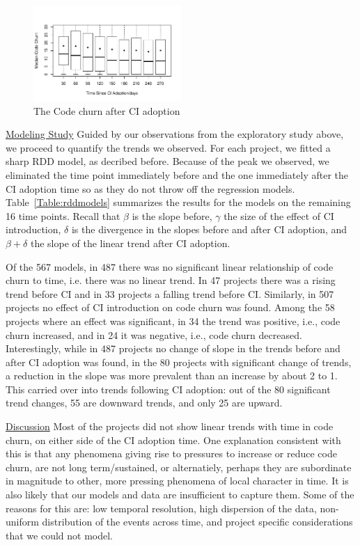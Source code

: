 \begin{figure}[!t]
\centering
\includegraphics[width=0.5\textwidth]{churn_after.pdf}
\caption{The Code churn after CI adoption}
\label{Fig:CodeChurnAfter}
\end{figure}

\noindent \underline{Modeling Study} 
Guided by our observations from the exploratory study above, we proceed to quantify the trends we observed.
For each project, we fitted a sharp RDD model, as decribed before.
Because of the peak we observed, we eliminated the time point immediately before and the one immediately after the CI adoption time so as they do not throw off the regression models.
Table~\ref{Table:rddmodels} summarizes the results for the models on the remaining 16 time points.
Recall that $\beta$ is the slope before, $\gamma$ the size of the effect of CI introduction, $\delta$ is the divergence in the slopes before and after CI adoption, and $\beta + \delta$ the slope of the linear trend after CI adoption.

Of the 567 models, in 487  there was no significant linear relationship of code churn to time, i.e. there was no linear trend.
In 47 projects there was a rising trend before CI and in 33 projects a falling trend before CI.
Similarly, in 507 projects no effect of CI introduction on code churn was found. Among the 58 projects where an effect was significant, in 34 the trend was positive, i.e., code churn increased, and in 24 it was negative, i.e., code churn decreased.
Interestingly, while in 487 projects no change of slope in the trends before and after CI adoption was found, in the 80 projects with significant change of trends, a reduction in the slope was more prevalent than an increase by about 2 to 1.
This carried over into trends following CI adoption: out of the 80 significant trend changes, 55 are downward trends, and only 25 are upward.



\noindent \underline{Discussion}
Most of the projects did not show linear trends with time in code churn, on either side of the CI adoption time.
One explanation consistent with this is that any phenomena giving rise to pressures to increase or reduce code churn, are not long term/sustained, or alternatiely, perhaps they are subordinate in magnitude to other, more pressing phenomena of local character in time.  
It is also likely that our models and data are insufficient to capture them.
Some of the reasons for this are: low temporal resolution, high dispersion of the data,
non-uniform distribution of the events across time, and project specific considerations that we could not model.

